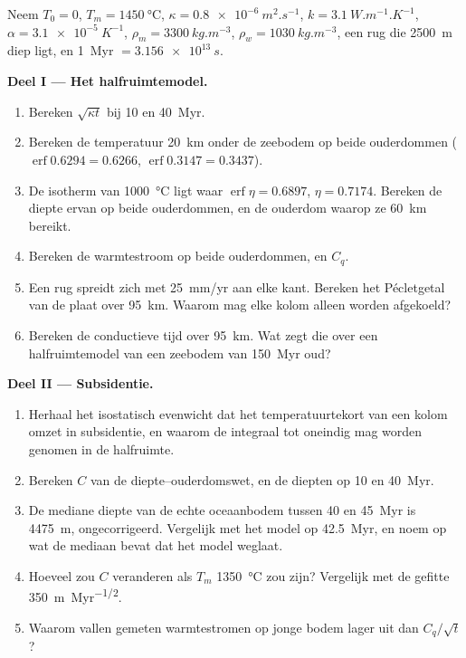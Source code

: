 \begin{problem}
\label{pb:b3:lithosphere-thermal-models:1}
Neem $T_0 = 0$, $T_m = \qty{1450}{\celsius}$, $\kappa =
\qty{0.8e-6}{m^2.s^{-1}}$, $k = \qty{3.1}{W.m^{-1}.K^{-1}}$, $\alpha =
\qty{3.1e-5}{K^{-1}}$, $\rho_m = \qty{3300}{kg.m^{-3}}$, $\rho_w =
\qty{1030}{kg.m^{-3}}$, een rug die \qty{2500}{m} diep ligt, en \qty{1}{Myr} $=
\qty{3.156e13}{s}$.

\medskip\noindent\textbf{Deel I --- Het halfruimtemodel.}
\begin{enumerate}
  \item Bereken $\sqrt{\kappa t}$ bij 10 en \qty{40}{Myr}.
  \item Bereken de temperatuur \qty{20}{km} onder de zeebodem op beide ouderdommen
        ($\operatorname{erf}0.6294 = 0.6266$, $\operatorname{erf}0.3147 =
        0.3437$).
  \item De isotherm van \qty{1000}{\celsius} ligt waar $\operatorname{erf}\eta =
        0.6897$, $\eta = 0.7174$. Bereken de diepte ervan op beide ouderdommen, en de ouderdom
        waarop ze \qty{60}{km} bereikt.
  \item Bereken de warmtestroom op beide ouderdommen, en $C_q$.
  \item Een rug spreidt zich met \qty{25}{mm/yr} aan elke kant. Bereken het Pécletgetal
        van de plaat over \qty{95}{km}. Waarom mag elke kolom alleen
        worden afgekoeld?
  \item Bereken de conductieve tijd over \qty{95}{km}. Wat zegt die over
        een halfruimtemodel van een zeebodem van \qty{150}{Myr} oud?
\end{enumerate}

\medskip\noindent\textbf{Deel II --- Subsidentie.}
\begin{enumerate}[resume]
  \item Herhaal het isostatisch evenwicht dat het temperatuurtekort van een
        kolom omzet in subsidentie, en waarom de integraal tot oneindig mag worden genomen
        in de halfruimte.
  \item Bereken $C$ van de diepte--ouderdomswet, en de diepten op 10 en
        \qty{40}{Myr}.
  \item De mediane diepte van de echte oceaanbodem tussen 40 en \qty{45}{Myr}
        is \qty{4475}{m}, ongecorrigeerd. Vergelijk met het model op
        \qty{42.5}{Myr}, en noem op wat de mediaan bevat dat het model
        weglaat.
  \item Hoeveel zou $C$ veranderen als $T_m$ \qty{1350}{\celsius} zou zijn?
        Vergelijk met de gefitte \qty{350}{m.Myr^{-1/2}}.
  \item Waarom vallen gemeten warmtestromen op jonge bodem lager uit dan $C_q/\sqrt t$?
\end{enumerate}


\end{problem}
